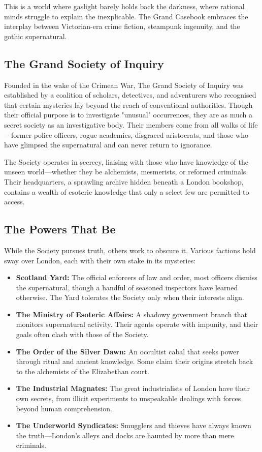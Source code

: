 This is a world where gaslight barely holds back the darkness, where rational minds struggle to explain the inexplicable. The Grand Casebook embraces the interplay between Victorian-era crime fiction, steampunk ingenuity, and the gothic supernatural.

\subsection{The Grand Society of Inquiry}

Founded in the wake of the Crimean War, The Grand Society of Inquiry was established by a coalition of scholars, detectives, and adventurers who recognised that certain mysteries lay beyond the reach of conventional authorities. Though their official purpose is to investigate "unusual" occurrences, they are as much a secret society as an investigative body. Their members come from all walks of life—former police officers, rogue academics, disgraced aristocrats, and those who have glimpsed the supernatural and can never return to ignorance.

The Society operates in secrecy, liaising with those who have knowledge of the unseen world—whether they be alchemists, mesmerists, or reformed criminals. Their headquarters, a sprawling archive hidden beneath a London bookshop, contains a wealth of esoteric knowledge that only a select few are permitted to access.

\subsection{The Powers That Be}

While the Society pursues truth, others work to obscure it. Various factions hold sway over London, each with their own stake in its mysteries:

\begin{itemize}
    \item \textbf{Scotland Yard:} The official enforcers of law and order, most officers dismiss the supernatural, though a handful of seasoned inspectors have learned otherwise. The Yard tolerates the Society only when their interests align.
    \item \textbf{The Ministry of Esoteric Affairs:} A shadowy government branch that monitors supernatural activity. Their agents operate with impunity, and their goals often clash with those of the Society.
    \item \textbf{The Order of the Silver Dawn:} An occultist cabal that seeks power through ritual and ancient knowledge. Some claim their origins stretch back to the alchemists of the Elizabethan court.
    \item \textbf{The Industrial Magnates:} The great industrialists of London have their own secrets, from illicit experiments to unspeakable dealings with forces beyond human comprehension.
    \item \textbf{The Underworld Syndicates:} Smugglers and thieves have always known the truth—London's alleys and docks are haunted by more than mere criminals.
\end{itemize}

